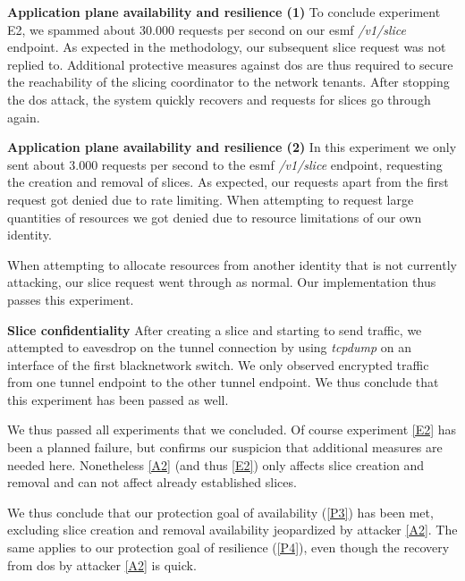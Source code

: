 \begin{description}[style=multiline, labelwidth=0.7cm]

    \item[\ref{E2}] \textbf{Application plane availability and resilience (1)} To conclude experiment E2, we spammed about 30.000 requests per second on our \acrshort{esmf} \textit{/v1/slice} endpoint. As expected in the methodology, our subsequent slice request was not replied to. Additional protective measures against \acrshort{dos} are thus required to secure the reachability of the slicing coordinator to the network tenants. After stopping the \acrshort{dos} attack, the system quickly recovers and requests for slices go through again.

    \item[\ref{E3}] \textbf{Application plane availability and resilience (2)} In this experiment we only sent about 3.000 requests per second to the \acrshort{esmf} \textit{/v1/slice} endpoint, requesting the creation and removal of slices. As expected, our requests apart from the first request got denied due to rate limiting. When attempting to request large quantities of resources we got denied due to resource limitations of our own identity.

    When attempting to allocate resources from another identity that is not currently attacking, our slice request went through as normal. Our implementation thus passes this experiment.

    \item[\ref{E4}] \textbf{Slice confidentiality} After creating a slice and starting to send traffic, we attempted to eavesdrop on the tunnel connection by using \textit{tcpdump} on an interface of the first \gls{blacknetwork} switch. We only observed encrypted traffic from one tunnel endpoint to the other tunnel endpoint. We thus conclude that this experiment has been passed as well.
\end{description}

We thus passed all experiments that we concluded. Of course experiment \ref{E2} has been a planned failure, but confirms our suspicion that additional measures are needed here. Nonetheless \ref{A2} (and thus \ref{E2}) only affects slice creation and removal and can not affect already established slices.

We thus conclude that our protection goal of availability (\ref{P3}) has been met, excluding slice creation and removal availability jeopardized by attacker \ref{A2}. The same applies to our protection goal of resilience (\ref{P4}), even though the recovery from \acrshort{dos} by attacker \ref{A2} is quick.

